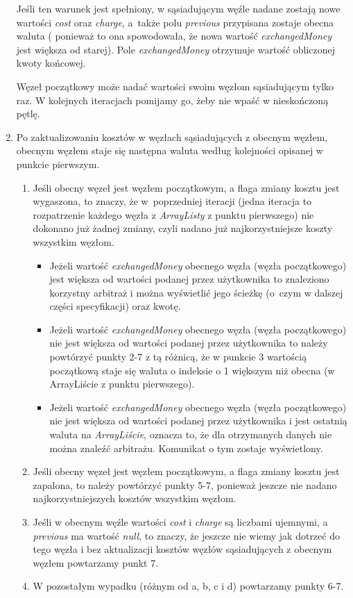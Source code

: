 \documentclass[a4paper,11pt]{article}
\begin{document}
\begin{enumerate}
Jeśli ten warunek jest spełniony, w sąsiadującym węźle nadane zostają nowe wartości \textit{cost} oraz \textit{charge}, a~także polu \textit{previous} przypisana zostaje obecna waluta ( ponieważ to ona spowodowała, że nowa wartość \textit{exchangedMoney} jest większa od starej). Pole \textit{exchangedMoney} otrzymuje wartość obliczonej kwoty końcowej.

Węzeł początkowy może nadać wartości swoim węzłom sąsiadującym tylko raz. W kolejnych iteracjach pomijamy go, żeby nie wpaść w nieskończoną pętlę.
\item Po zaktualizowaniu kosztów w węzłach sąsiadujących z obecnym węzłem, obecnym węzłem staje się następna waluta według kolejności opisanej w punkcie pierwszym.
\begin{enumerate}
\item Jeśli obecny węzeł jest węzłem początkowym, a flaga zmiany kosztu jest wygaszona, to znaczy, że w~poprzedniej iteracji (jedna iteracja to rozpatrzenie każdego węzła z \textit{ArrayListy} z punktu pierwszego) nie dokonano już żadnej zmiany, czyli nadano już najkorzystniejsze koszty wszystkim węzłom.
\begin{itemize}
\item Jeżeli wartość \textit{exchangedMoney} obecnego węzła (węzła początkowego) jest większa od wartości podanej przez użytkownika to znaleziono korzystny arbitraż i można wyświetlić jego ścieżkę (o~czym w dalszej części specyfikacji) oraz kwotę.
\item Jeżeli wartość \textit{exchangedMoney} obecnego węzła (węzła początkowego) nie jest większa od wartości podanej przez użytkownika to należy powtórzyć punkty 2-7 z tą różnicą, że w punkcie 3 wartością początkową staje się waluta o indeksie o 1 większym niż obecna (w ArrayLiście z punktu pierwszego).
\item Jeżeli wartość \textit{exchangedMoney} obecnego węzła (węzła początkowego) nie jest większa od wartości podanej przez użytkownika i jest ostatnią waluta na \textit{ArrayLiście}, oznacza to, że dla otrzymanych danych nie można znaleźć arbitrażu. Komunikat o tym zostaje wyświetlony.
\end{itemize}
\item Jeśli obecny węzeł jest węzłem początkowym, a flaga zmiany kosztu jest zapalona, to należy powtórzyć punkty 5-7, ponieważ jeszcze nie nadano najkorzystniejszych kosztów wszystkim węzłom.
\item Jeśli w obecnym węźle wartości \textit{cost} i \textit{charge} są liczbami ujemnymi, a \textit{previous} ma wartość \textit{null}, to znaczy, że jeszcze nie wiemy jak dotrzeć do tego węzła i bez aktualizacji kosztów węzłów sąsiadujących z obecnym węzłem powtarzamy punkt 7.
\item W pozostałym wypadku (różnym od a, b, c i d) powtarzamy punkty 6-7.
\end{enumerate}
\end{enumerate}
\end{document}
